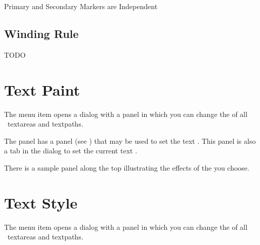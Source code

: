 {}
{Primary and Secondary Markers are Independent}

\subsection{Winding Rule}\label{sec:winding}




TODO


\section{Text Paint}\label{sec:textpaint}


The  menu item opens a dialog
with a  panel in which
you can change the  
of all \selected\ \glspl{textarea} and \glspl{textpath}.


The  panel has a  panel
(see ) that may be used to set the 
text . This panel is also a tab
in the  dialog to set the current
text .

There is a sample panel along the top illustrating the effects of
the  you choose.

\section{Text Style}\label{sec:textstyle}


The  menu item opens a dialog
with a  panel in which
you can change the  
of all \selected\ \glspl{textarea} and \glspl{textpath}.


